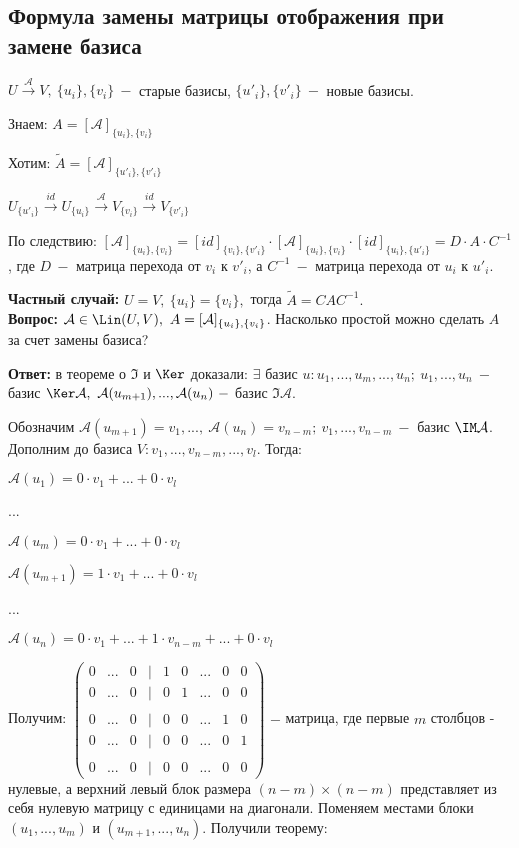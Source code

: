 \subsection{Формула замены матрицы отображения при замене базиса}
$U\xrightarrow{\mathcal{A}}V,\ \{u_i\},\{v_i\}\ -$ старые базисы, 
$\{u'_i\},\{v'_i\}\ -$ новые базисы.

Знаем: $A=[\mathcal{A}]_{\{u_i\},\{v_i\}}$

Хотим: $\tilde{A}=[\mathcal{A}]_{\{u'_i\},\{v'_i\}}$

$U_{\{u'_i\}}\xrightarrow{id}U_{\{u_i\}}\xrightarrow{\mathcal{A}}V_{\{v_i\}}\xrightarrow{id}V_{\{v'_i\}}$

По следствию: 
$[\mathcal{A}]_{\{u_i\},\{v_i\}}=[id]_{\{v_i\},\{v'_i\}}\cdot 
[\mathcal{A}]_{\{u_i\},\{v_i\}}\cdot [id]_{\{u_i\},\{u'_i\}}=D\cdot A\cdot 
C^{-1}$, где $D\ -$ матрица перехода от $v_i$ к $v'_i$, а $C^{-1}\ -$ 
матрица перехода от $u_i$ к $u'_i$.

\textbf{Частный случай:} $U=V,\ \{u_i\}=\{v_i\},$ тогда 
$\tilde{A}=CAC^{-1}.$ \\



\textbf{Вопрос:} $\mathcal{A}\in \Lin (U,V),\ 
A=[\mathcal{A}]_{\{u_i\},\{v_i\}}$. Насколько простой можно сделать $A$ за 
счет замены базиса? 

\textbf{Ответ:} в теореме о $\Im$ и $\Ker$ доказали: $\exists$ базис 
$u:u_1,...,u_m,...,u_n;\ u_1,...,u_n\ -$ базис $\Ker\mathcal{A},\ 
\mathcal{A}(u_{m+1}),...,\mathcal{A}(u_n)\ -$ базис $\Im \mathcal{A}$.

Обозначим $\mathcal{A}(u_{m+1})=v_1,...,\ \mathcal{A}(u_n)=v_{n-m};\ 
v_1,...,v_{n-m}\ -$ базис $\IM \mathcal{A}$. Дополним до базиса 
$V:v_1,...,v_{n-m},...,v_l$. Тогда:

$\mathcal{A}(u_1)=0\cdot v_1+...+0\cdot v_l$

...

$\mathcal{A}(u_m)=0\cdot v_1+...+0\cdot v_l$

$\mathcal{A}(u_{m+1})=1\cdot v_1+...+0\cdot v_l$

...

$\mathcal{A}(u_n)=0\cdot v_1+...+1\cdot v_{n-m}+...+0\cdot v_l$

Получим: $\begin{pmatrix}
    0 & ... & 0 & | & 1 & 0 & ... & 0 & 0 \\
    0 & ... & 0 & | & 0 & 1 & ... & 0 & 0 \\
    \\
    0 & ... & 0 & | & 0 & 0 & ... & 1 & 0 \\
    0 & ... & 0 & | & 0 & 0 & ... & 0 & 1 \\
    \\
    0 & ... & 0 & | & 0 & 0 & ... & 0 & 0 
\end{pmatrix}$ $-$ матрица, где первые $m$ столбцов - нулевые, а верхний 
левый блок размера $(n-m)\times(n-m)$ представляет из себя нулевую матрицу 
с единицами на диагонали. Поменяем местами блоки $(u_1,...,u_m)$ и 
$(u_{m+1},...,u_n)$. Получили теорему:

